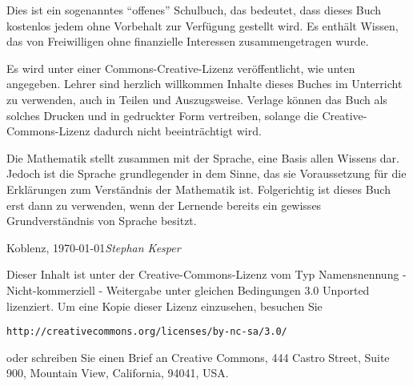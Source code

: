 \preface

Dies ist ein sogenanntes "`offenes"' Schulbuch, das bedeutet, dass dieses Buch kostenlos jedem ohne Vorbehalt zur Verfügung gestellt wird. Es enthält Wissen, das von Freiwilligen ohne finanzielle Interessen zusammengetragen wurde. 

Es wird unter einer Commons-Creative-Lizenz veröffentlicht, wie unten angegeben. Lehrer sind herzlich willkommen Inhalte dieses Buches im Unterricht zu verwenden, auch in Teilen und Auszugsweise. Verlage können das Buch als solches Drucken und in gedruckter Form vertreiben, solange die Creative-Commons-Lizenz dadurch nicht beeinträchtigt wird.

Die Mathematik stellt zusammen mit der Sprache, eine Basis allen Wissens dar. Jedoch ist die Sprache grundlegender in dem Sinne, das sie Voraussetzung für die Erklärungen zum Verständnis der Mathematik ist. Folgerichtig ist dieses Buch erst dann zu verwenden, wenn der Lernende bereits ein gewisses Grundverständnis von Sprache besitzt. 


\vspace{\baselineskip}
\begin{flushright}\noindent
Koblenz, \today \hfill {\it Stephan Kesper}
\end{flushright}

\vfill

\noindent Dieser Inhalt ist unter der Creative-Commons-Lizenz vom Typ Namensnennung - Nicht-kommerziell - Weitergabe unter gleichen Bedingungen 3.0 Unported lizenziert. Um eine Kopie dieser Lizenz einzusehen, besuchen Sie

\bigskip
\begin{center}
\texttt{http://creativecommons.org/licenses/by-nc-sa/3.0/}
\end{center}

\bigskip

\noindent oder schreiben Sie einen Brief an Creative Commons, 444 Castro Street, Suite 900, Mountain View, California, 94041, USA.


